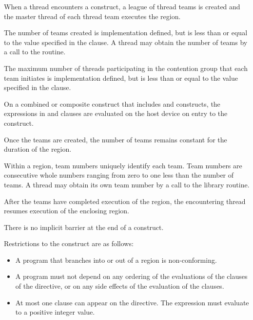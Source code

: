 {{{{\begin{samepage}
\descr
When a thread encounters a  construct, a league of thread teams is created and 
the master thread of each thread team executes the  region.

The number of teams created is implementation defined, but is less than or equal to the 
value specified in the  clause.
A thread may obtain the number of teams by a call to the  routine.

\end{samepage}

The maximum number of threads participating in the contention group that each team 
initiates is implementation defined, but is less than or equal to the value specified in the 
 clause.

On a combined or composite construct that includes  and
 constructs, the expressions in  and
 clauses are evaluated on the host device on
entry to the  construct.

Once the teams are created, the number of teams remains constant for the duration of the 
 region.

Within a  region, team numbers uniquely identify each team. Team numbers are 
consecutive whole numbers ranging from zero to one less than the number of teams. A 
thread may obtain its own team number by a call to the  library 
routine.

After the teams have completed execution of the  region, the encountering thread 
resumes execution of the enclosing  region.

There is no implicit barrier at the end of a  construct.

\restrictions
Restrictions to the  construct are as follows:

\begin{itemize}
\item A program that branches into or out of a  region is non-conforming.

\item A program must not depend on any ordering of the evaluations of the clauses of the 
 directive, or on any side effects of the evaluation of the clauses.

\item At most one  clause can appear on the directive. The 
 expression must evaluate to a positive integer value.


\end{itemize}}}}}

